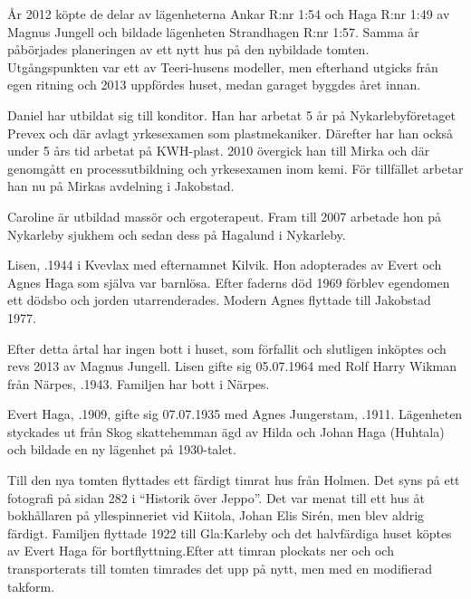 År 2012 köpte de delar av lägenheterna Ankar R:nr 1:54 och Haga R:nr 1:49 av Magnus Jungell och bildade lägenheten Strandhagen R:nr 1:57. Samma år påbörjades planeringen av ett nytt hus på den nybildade tomten. Utgångspunkten var ett av Teeri-husens modeller, men efterhand utgicks från egen ritning och 2013 uppfördes huset, medan garaget byggdes året innan.

Daniel har utbildat sig till konditor. Han har arbetat 5 år på Nykarlebyföretaget Prevex och där avlagt yrkesexamen som plastmekaniker. Därefter har han också under 5 års tid arbetat på KWH-plast. 2010 övergick han till Mirka  och där genomgått en processutbildning och yrkesexamen inom kemi. För tillfället arbetar han nu på Mirkas avdelning i Jakobstad.

Caroline är utbildad massör och ergoterapeut. Fram till 2007 arbetade hon på Nykarleby sjukhem och sedan dess på Hagalund i Nykarleby.

\begin{jhchildren}
  \item {}
  \item {}
\end{jhchildren}





Lisen, .1944 i Kvevlax med efternamnet Kilvik. Hon adopterades av Evert och Agnes Haga som själva var barnlösa. Efter faderns död 1969 förblev egendomen ett dödsbo och jorden utarrenderades. Modern Agnes flyttade till Jakobstad 1977.

Efter detta årtal har ingen bott i huset, som förfallit och slutligen inköptes och revs 2013 av Magnus Jungell. Lisen gifte sig 05.07.1964 med Rolf Harry Wikman från Närpes, .1943. Familjen har bott i Närpes.


Evert Haga, .1909, gifte sig 07.07.1935  med Agnes Jungerstam, .1911. Lägenheten styckades ut från Skog skattehemman ägd av Hilda och Johan Haga (Huhtala) och bildade en  ny lägenhet på 1930-talet.

Till den nya tomten flyttades ett färdigt timrat hus från Holmen. Det syns på ett fotografi på sidan 282 i ``Historik över Jeppo''. Det var menat till ett hus åt bokhållaren på yllespinneriet vid Kiitola, Johan Elis Sirén, men blev aldrig färdigt. Familjen flyttade 1922 till Gla:Karleby och det halvfärdiga huset köptes av Evert Haga för bortflyttning.Efter att timran plockats ner och och transporterats till tomten timrades det upp på nytt, men med en modifierad takform.

